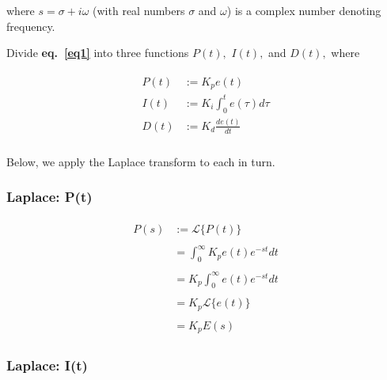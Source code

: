 \documentclass[11pt]{article}
\theoremstyle{definition}
\begin{document}
where $s = \sigma + i\omega$ (with real numbers $\sigma$ and $\omega$) is a complex number denoting frequency.

Divide \textbf{eq.~\ref{eq1}} into three functions $P(t),$ $I(t),$ and $D(t),$ where

\begin{align*}
\begin{split}
    P(t) &:= K_{p}e(t) \\
    I(t) &:= K_{i}\int_{0}^{t}e(\tau)d\tau \\
    D(t) &:= K_{d}\frac{de(t)}{dt} \\
\end{split}
\end{align*}

Below, we apply the Laplace transform to each in turn.

\subsubsection{Laplace: P(t)}

\begin{align*}
    \begin{split}
        P(s) &:= \mathcal{L}\{P(t)\} \\\\
             &= \int_{0}^{\infty} K_{p}e(t)e^{-st}dt \\\\
             &= K_{p}\int_{0}^{\infty}e(t)e^{-st}dt \\\\
             &= K_{p}\mathcal{L}\{e(t)\} \\\\
             &= K_{p}E(s)
    \end{split}
\end{align*}

\subsubsection{Laplace: I(t)}
\end{document}
